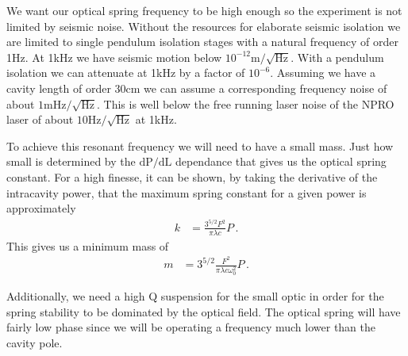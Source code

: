 \acresetall

%
%


We want our optical spring frequency to be high enough so the experiment is
not limited by seismic noise.
Without the resources for elaborate seismic isolation we are limited to single
pendulum isolation stages with a natural frequency of order 1Hz.
At 1kHz we have seismic motion below $10^{-12} \mathrm{m/\sqrt{Hz}}$.
With a pendulum isolation we can attenuate at 1kHz by a factor of $10^{-6}$.
Assuming we have a cavity length of order 30cm we can assume a corresponding
frequency noise of about $1 \mathrm{mHz/\sqrt{Hz}}$.
This is well below the free running laser noise of the NPRO laser of about
$10\mathrm{Hz/\sqrt{Hz}}$ at 1kHz.


To achieve this resonant frequency we will need to have a small mass.
Just how small is determined by the $\mathrm{dP/dL}$ dependance that gives
us the optical spring constant.
For a high finesse, it can be shown, by taking the derivative of the
intracavity power,
that the maximum spring constant for a given power is approximately
\begin{align}
k &= \frac{3^{5/2} F^2}{\pi \lambda c} P \,.
\end{align}
This gives us a minimum mass of
\begin{align}
m &= 3^{5/2} \frac{F^2}{\pi \lambda c \omega^2_0} P \, .
\end{align}


%
%

Additionally, we need a high Q suspension for the small optic in order for the
spring stability to be dominated by the optical field.
The optical spring will have fairly low phase since we will be operating a
frequency much lower than the cavity pole.



